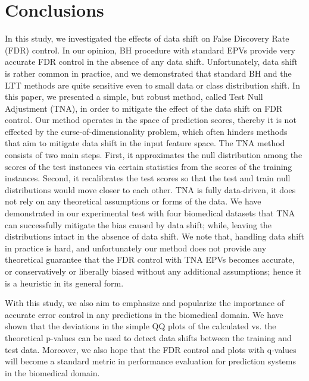 \documentclass{article}
\begin{document}
\section{Conclusions}

In this study, we investigated the effects of data shift on False Discovery Rate (FDR) control. In our opinion, BH procedure with standard EPVs provide very accurate FDR control in the absence of any data shift. Unfortunately, data shift is rather common in practice, and we demonstrated that standard BH and the LTT methods are quite sensitive even to small data or class distribution shift. In this paper, we presented a simple, but robust method, called Test Null Adjustment (TNA), in order to mitigate the effect of the data shift on FDR control. Our method operates in the space of prediction scores, thereby it is not effected by the curse-of-dimensionality problem, which often hinders methods that aim to mitigate data shift in the input feature space. The TNA method consists of two main steps. First, it approximates the null distribution among the scores of the test instances via certain statistics from the scores of the training instances. Second, it recalibrates the test scores so that the test and train null distributions would move closer to each other. TNA is fully data-driven, it does not rely on any theoretical assumptions or forms of the data. We have demonstrated in our experimental test with four biomedical datasets that TNA can successfully mitigate the bias caused by data shift; while, leaving the distributions intact in the absence of data shift. We note that, handling data shift in practice is hard, and unfortunately our method does not provide any theoretical guarantee that the FDR control with TNA EPVs becomes accurate, or conservatively or liberally biased without any additional assumptions; hence it is a heuristic in its general form.  

With this study, we also aim to emphasize and popularize the importance of accurate error control in any predictions in the biomedical domain. We have shown that the deviations in the simple QQ plots of the calculated vs. the theoretical p-values can be used to detect data shifts between the training and test data. Moreover, we also hope that the FDR control and plots with q-values will become a standard metric in performance evaluation for prediction systems in the biomedical domain.
\end{document}
